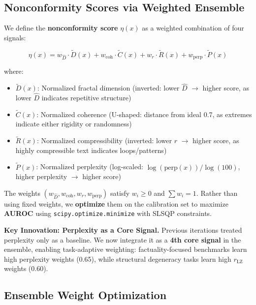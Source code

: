 \documentclass[11pt]{article}
\begin{document}
\subsection{Nonconformity Scores via Weighted Ensemble}
\label{sec:conformal-scores}

We define the \textbf{nonconformity score} $\eta(x)$ as a weighted combination of four signals:

\begin{equation}
\eta(x) = w_{\hat{D}} \cdot \tilde{D}(x) + w_{\text{coh}} \cdot \tilde{C}(x) + w_{r} \cdot \tilde{R}(x) + w_{\text{perp}} \cdot \tilde{P}(x)
\end{equation}

where:
\begin{itemize}
\item $\tilde{D}(x)$: Normalized fractal dimension (inverted: lower $\hat{D}$ $\rightarrow$ higher score, as lower $\hat{D}$ indicates repetitive structure)
\item $\tilde{C}(x)$: Normalized coherence (U-shaped: distance from ideal 0.7, as extremes indicate either rigidity or randomness)
\item $\tilde{R}(x)$: Normalized compressibility (inverted: lower $r$ $\rightarrow$ higher score, as highly compressible text indicates loops/patterns)
\item $\tilde{P}(x)$: Normalized perplexity (log-scaled: $\log(\text{perp}(x)) / \log(100)$, higher perplexity $\rightarrow$ higher score)
\end{itemize}

The weights $(w_{\hat{D}}, w_{\text{coh}}, w_r, w_{\text{perp}})$ satisfy $w_i \ge 0$ and $\sum w_i = 1$. Rather than using fixed weights, we \textbf{optimize} them on the calibration set to maximize \textbf{AUROC} using \texttt{scipy.optimize.minimize} with SLSQP constraints.

\textbf{Key Innovation: Perplexity as a Core Signal.}
Previous iterations treated perplexity only as a baseline. We now integrate it as a \textbf{4th core signal} in the ensemble, enabling task-adaptive weighting: factuality-focused benchmarks learn high perplexity weights (0.65), while structural degeneracy tasks learn high $r_{\text{LZ}}$ weights (0.60).

\subsection{Ensemble Weight Optimization}
\label{sec:conformal-weights}
\end{document}
